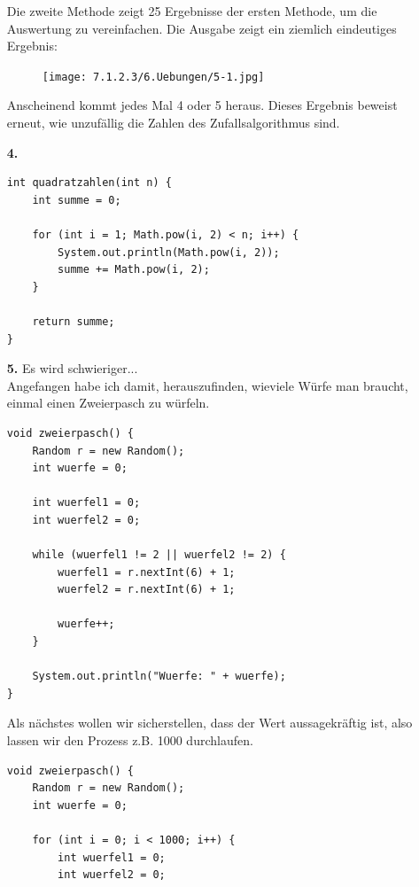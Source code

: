 \documentclass{scrartcl}   %
\begin{document}
\begin{itemize}
    Die zweite Methode zeigt 25 Ergebnisse der ersten Methode, um die Auswertung zu vereinfachen. Die Ausgabe zeigt ein ziemlich eindeutiges Ergebnis:
    
    \begin{figure}[ht]
	    \centering
	    \texttt{[image: 7.1.2.3/6.Uebungen/5-1.jpg]}
    \end{figure}
    
    Anscheinend kommt jedes Mal 4 oder 5 heraus. Dieses Ergebnis beweist erneut, wie \glqq unzufällig\grqq{} die Zahlen des Zufallsalgorithmus sind.
    
    \newpage
    
    \item[\textbf{4.}]
    \begin{lstlisting}
int quadratzahlen(int n) {
    int summe = 0;
    
    for (int i = 1; Math.pow(i, 2) < n; i++) {
        System.out.println(Math.pow(i, 2));
        summe += Math.pow(i, 2);
    }
    
    return summe;
}
    \end{lstlisting}
    \item[\textbf{5.}] Es wird schwieriger...\\
    Angefangen habe ich damit, herauszufinden, wieviele Würfe man braucht, einmal einen Zweierpasch zu würfeln.\\
    \begin{lstlisting}
void zweierpasch() {
    Random r = new Random();
    int wuerfe = 0;
    
    int wuerfel1 = 0;
    int wuerfel2 = 0;
    
    while (wuerfel1 != 2 || wuerfel2 != 2) {
        wuerfel1 = r.nextInt(6) + 1;
        wuerfel2 = r.nextInt(6) + 1;
    
        wuerfe++;
    }
    
    System.out.println("Wuerfe: " + wuerfe);
}
    \end{lstlisting}
    
    \newpage
    
    Als nächstes wollen wir sicherstellen, dass der Wert aussagekräftig ist, also lassen wir den Prozess z.B. 1000 durchlaufen.\\
    \begin{lstlisting}
void zweierpasch() {
    Random r = new Random();
    int wuerfe = 0;
    
    for (int i = 0; i < 1000; i++) {
        int wuerfel1 = 0;
        int wuerfel2 = 0;
        

\end{lstlisting}
\end{itemize}
\end{document}
